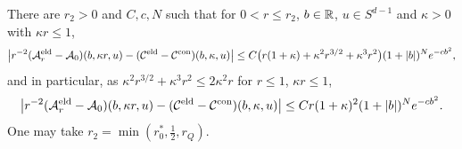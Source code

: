 \begin{lemma}\label{lem:third-CE}
There are $r_2>0$ and $C,c,N$ such that for $0<r\le r_2$, $b\in\mathbb R$, $u\in S^{d-1}$ and $\kappa>0$ with $\kappa r\le1$,
\begin{equation}\label{eq:third-CEp1}
\bigl|r^{-2}(\mathcal A^{\mathrm{eld}}_r-\mathcal A_0)(b,\kappa r,u)-(\mathcal C^{\mathrm{eld}}-\mathcal C^{\rm con})(b,\kappa,u)\bigr|\le C\bigl(r(1+\kappa)+\kappa^2r^{3/2}+\kappa^3r^2\bigr)(1+|b|)^Ne^{-cb^2},
\end{equation}
and in particular, as $\kappa^2r^{3/2}+\kappa^3r^2\le2\kappa^2r$ for $r\le1$, $\kappa r\le1$,
\begin{equation}\label{eq:third-CE1}
\bigl|r^{-2}(\mathcal A^{\mathrm{eld}}_r-\mathcal A_0)(b,\kappa r,u)-(\mathcal C^{\mathrm{eld}}-\mathcal C^{\rm con})(b,\kappa,u)\bigr|\le Cr(1+\kappa)^2(1+|b|)^Ne^{-cb^2}.
\end{equation}
One may take $r_2=\min(r_0^*,\frac12,r_Q)$.
\end{lemma}

